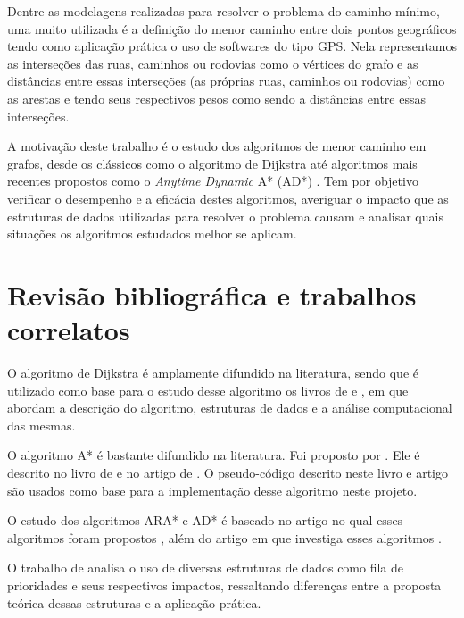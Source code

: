 Dentre as modelagens realizadas para resolver o problema do caminho mínimo, uma muito utilizada é a definição do menor caminho entre dois pontos geográficos tendo como aplicação prática o uso de softwares do tipo GPS. Nela representamos as interseções das ruas, caminhos ou rodovias como o vértices do grafo e as distâncias entre essas interseções (as próprias ruas, caminhos ou rodovias) como as arestas e tendo seus respectivos pesos como sendo a distâncias entre essas interseções.


A motivação deste trabalho é o estudo dos algoritmos de menor caminho em grafos, desde os clássicos como o algoritmo de Dijkstra \cite{dijkstra1959note} até algoritmos mais recentes propostos como o \textit{Anytime Dynamic} A* (AD*) \cite{likhachev2008anytime}. Tem por  objetivo verificar o desempenho e a eficácia destes algoritmos, averiguar o impacto que as estruturas de dados utilizadas para resolver o problema causam e analisar quais situações os algoritmos estudados melhor se aplicam.

\section{Revisão bibliográfica e trabalhos correlatos}
\label{sec-intro-correlatos}
O algoritmo de Dijkstra é amplamente difundido na literatura, sendo que é utilizado como base para o estudo desse algoritmo os livros de  e , em que abordam a descrição do algoritmo, estruturas de dados e a análise computacional das mesmas.

O algoritmo A* é bastante difundido na literatura. Foi proposto por . Ele é descrito no livro de  e no artigo de . O pseudo-código descrito neste livro e artigo são usados como base para a implementação desse algoritmo neste projeto.

O estudo dos algoritmos ARA* e AD* é baseado no artigo no qual esses algoritmos foram propostos \cite{likhachev2008anytime}, além do artigo em que investiga esses algoritmos \cite{moura2010estudo}.

O trabalho de  analisa o uso de diversas estruturas de dados como fila de prioridades e seus respectivos impactos, ressaltando diferenças entre a proposta teórica dessas estruturas e a aplicação prática.
